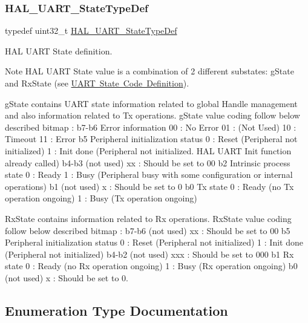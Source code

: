 \subsubsection{\texorpdfstring{HAL\_UART\_StateTypeDef}{HAL\_UART\_StateTypeDef}}
{\footnotesize\ttfamily typedef uint32\+\_\+t \mbox{\hyperlink{group___u_a_r_t___exported___types_ga94c58ae1f4dbcf6032224edfc93a6e19}{H\+A\+L\+\_\+\+U\+A\+R\+T\+\_\+\+State\+Type\+Def}}}



H\+AL U\+A\+RT State definition. 

\begin{DoxyNote}{Note}
H\+AL U\+A\+RT State value is a combination of 2 different substates\+: g\+State and Rx\+State (see \mbox{\hyperlink{group___u_a_r_t___state___definition}{U\+A\+RT State Code Definition}}).
\begin{DoxyItemize}
\item g\+State contains U\+A\+RT state information related to global Handle management and also information related to Tx operations. g\+State value coding follow below described bitmap \+: b7-\/b6 Error information 00 \+: No Error 01 \+: (Not Used) 10 \+: Timeout 11 \+: Error b5 Peripheral initialization status 0 \+: Reset (Peripheral not initialized) 1 \+: Init done (Peripheral not initialized. H\+AL U\+A\+RT Init function already called) b4-\/b3 (not used) xx \+: Should be set to 00 b2 Intrinsic process state 0 \+: Ready 1 \+: Busy (Peripheral busy with some configuration or internal operations) b1 (not used) x \+: Should be set to 0 b0 Tx state 0 \+: Ready (no Tx operation ongoing) 1 \+: Busy (Tx operation ongoing)
\item Rx\+State contains information related to Rx operations. Rx\+State value coding follow below described bitmap \+: b7-\/b6 (not used) xx \+: Should be set to 00 b5 Peripheral initialization status 0 \+: Reset (Peripheral not initialized) 1 \+: Init done (Peripheral not initialized) b4-\/b2 (not used) xxx \+: Should be set to 000 b1 Rx state 0 \+: Ready (no Rx operation ongoing) 1 \+: Busy (Rx operation ongoing) b0 (not used) x \+: Should be set to 0. 
\end{DoxyItemize}
\end{DoxyNote}


\subsection{Enumeration Type Documentation}
\mbox{\label{group___u_a_r_t___exported___types_gad957348fe227e5cb75b70be026c5ae81}} 
